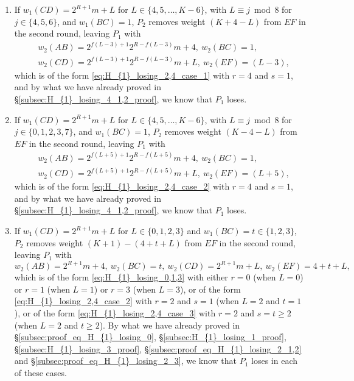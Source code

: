 \documentclass[11pt,reqno]{amsart}
\theoremstyle{definition}
\theoremstyle{definition}
\begin{document}
\begin{enumerate}
\begin{enumerate}
\item If $w_{1}(CD)=2^{R+1}m+L$ for $L \in \{4,5,\ldots,K-6\}$, with $L \equiv j \bmod 8$ for $j \in \{4,5,6\}$, and $w_{1}(BC)=1$, $P_{2}$ removes weight $(K+4-L)$ from $EF$ in the second round, leaving $P_{1}$ with
\begin{align}
{}&w_{2}(AB)=2^{f(L-3)+1}2^{R-f(L-3)}m+4,\ w_{2}(BC)=1,\nonumber\\
{}&w_{2}(CD)=2^{f(L-3)+1}2^{R-f(L-3)}m+L,\ w_{2}(EF)=(L-3),\nonumber
\end{align}
which is of the form \eqref{eq:H_{1}_losing_2,4_case_1} with $r=4$ and $s=1$, and by what we have already proved in \S\ref{subsec:H_{1}_losing_4_1,2_proof}, we know that $P_{1}$ loses.

\item If $w_{1}(CD)=2^{R+1}m+L$ for $L \in \{4,5,\ldots,K-6\}$, with $L \equiv j \bmod 8$ for $j \in \{0,1,2,3,7\}$, and $w_{1}(BC)=1$, $P_{2}$ removes weight $(K-4-L)$ from $EF$ in the second round, leaving $P_{1}$ with 
\begin{align}
{}&w_{2}(AB)=2^{f(L+5)+1}2^{R-f(L+5)}m+4,\ w_{2}(BC)=1,\nonumber\\
{}&w_{2}(CD)=2^{f(L+5)+1}2^{R-f(L+5)}m+L,\ w_{2}(EF)=(L+5),\nonumber
\end{align}
which is of the form \eqref{eq:H_{1}_losing_2,4_case_2} with $r=4$ and $s=1$, and by what we have already proved in \S\ref{subsec:H_{1}_losing_4_1,2_proof}, we know that $P_{1}$ loses.

\item If $w_{1}(CD)=2^{R+1}m+L$ for $L \in \{0,1,2,3\}$ and $w_{1}(BC)=t\in\{1,2,3\}$, $P_{2}$ removes weight $(K+1)-(4+t+L)$ from $EF$ in the second round, leaving $P_{1}$ with
\begin{equation}
w_{2}(AB)=2^{R+1}m+4,\ w_{2}(BC)=t,\ w_{2}(CD)=2^{R+1}m+L,\ w_{2}(EF)=4+t+L,\nonumber
\end{equation}
which is of the form \eqref{eq:H_{1}_losing_0,1,3} with either $r=0$ (when $L=0$) or $r=1$ (when $L=1$) or $r=3$ (when $L=3$), or of the form \eqref{eq:H_{1}_losing_2,4_case_2} with $r=2$ and $s=1$ (when $L=2$ and $t=1$), or of the form \eqref{eq:H_{1}_losing_2,4_case_3} with $r=2$ and $s=t\geqslant 2$ (when $L=2$ and $t \geqslant 2$). By what we have already proved in \S\ref{subsec:proof_eq_H_{1}_losing_0}, \S\ref{subsec:H_{1}_losing_1_proof}, \S\ref{subsec:H_{1}_losing_3_proof}, \S\ref{subsec:proof_eq_H_{1}_losing_2_1,2} and \S\ref{subsec:proof_eq_H_{1}_losing_2_3}, we know that $P_{1}$ loses in each of these cases. 


\end{enumerate}
\end{enumerate}
\end{document}
